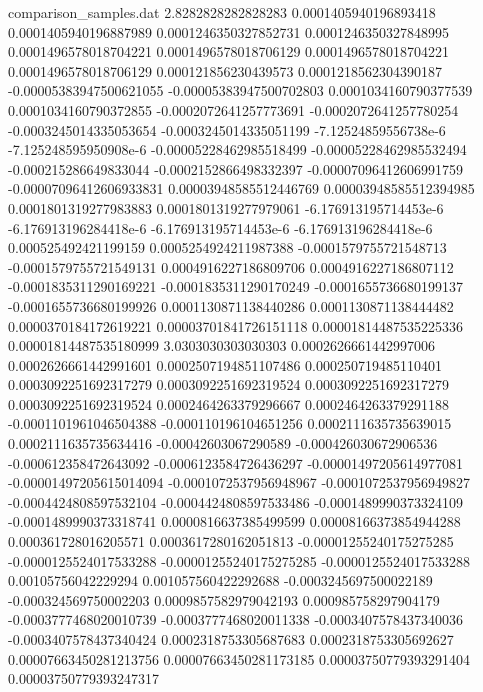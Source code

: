 \begin{filecontents}{comparison_samples.dat}
2.8282828282828283  0.0001405940196893418   0.0001405940196887989   0.0001246350327852731  0.0001246350327848995  0.0001496578018704221  0.0001496578018706129  0.0001496578018704221  0.0001496578018706129  0.000121856230439573   0.0001218562304390187  -0.00005383947500621055 -0.00005383947500702803 0.0001034160790377539  0.0001034160790372855  -0.0002072641257773691  -0.0002072641257780254  -0.0003245014335053654  -0.0003245014335051199  -7.12524859556738e-6    -7.125248595950908e-6   -0.00005228462985518499 -0.00005228462985532494 -0.000215286649833044   -0.0002152866498332397  -0.00007096412606991759 -0.00007096412606933831 0.00003948585512446769 0.00003948585512394985 0.0001801319277983883  0.0001801319277979061  -6.176913195714453e-6   -6.176913196284418e-6   -6.176913195714453e-6   -6.176913196284418e-6   0.000525492421199159   0.0005254924211987388  -0.0001579755721548713  -0.0001579755721549131  0.0004916227186809706  0.0004916227186807112  -0.0001835311290169221  -0.0001835311290170249  -0.0001655736680199137  -0.0001655736680199926  0.0001130871138440286  0.0001130871138444482  0.0000370184172619221  0.00003701841726151118 0.00001814487535225336  0.00001814487535180999
3.0303030303030303  0.0002626661442997006   0.0002626661442991601   0.0002507194851107486  0.000250719485110401   0.0003092251692317279  0.0003092251692319524  0.0003092251692317279  0.0003092251692319524  0.0002464263379296667  0.0002464263379291188  -0.0001101961046504388  -0.000110196104651256   0.0002111635735639015  0.0002111635735634416  -0.00042603067290589    -0.000426030672906536   -0.000612358472643092   -0.0006123584726436297  -0.00001497205614977081 -0.00001497205615014094 -0.0001072537956948967  -0.0001072537956949827  -0.0004424808597532104  -0.0004424808597533486  -0.0001489990373324109  -0.0001489990373318741  0.0000816637385499599  0.00008166373854944288 0.000361728016205571   0.0003617280162051813  -0.00001255240175275285 -0.0000125524017533288  -0.00001255240175275285 -0.0000125524017533288  0.00105756042229294    0.001057560422292688   -0.0003245697500022189  -0.000324569750002203   0.0009857582979042193  0.000985758297904179   -0.0003777468020010739  -0.0003777468020011338  -0.0003407578437340036  -0.0003407578437340424  0.0002318753305687683  0.0002318753305692627  0.00007663450281213756 0.00007663450281173185 0.00003750779393291404  0.00003750779393247317

\end{filecontents}
